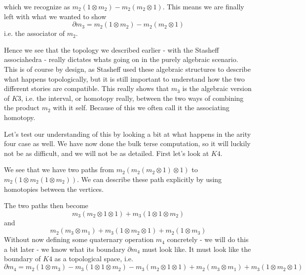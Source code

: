 which we recognize as $m_2(1\otimes m_2) - m_2(m_2\otimes 1)$. This means we are finally left with what we wanted to show 
\begin{equation*}
    \partial m_3 = m_2(1\otimes m_2)-m_2(m_2\otimes 1)
\end{equation*}
i.e. the associator of $m_2$. 

Hence we see that the topology we described earlier - with the Stasheff associahedra - really dictates whats going on in the purely algebraic scenario. This is of course by design, as Stasheff used these algebraic structures to describe what happens topologically, but it is still important to understand how the two different stories are compatible. This really shows that $m_3$ is the algebraic version of $K3$, i.e. the interval, or homotopy really, between the two ways of combining the product $m_2$ with it self. Because of this we often call it the associating homotopy. 

Let's test our understanding of this by looking a bit at what happens in the arity four case as well. We have now done the bulk terse computation, so it will luckily not be as difficult, and we will not be as detailed. First let's look at $K4$. 

\hspace{2mm}

\begin{center}
\def\svgwidth{0.7\textwidth}

\end{center}

\hspace{1mm}

We see that we have two paths from $m_2(m_2(m_2\otimes 1)\otimes 1)$ to $m_2(1\otimes m_2(1\otimes m_2))$. We can describe these path explicitly by using homotopies between the vertices. 

\hspace{1mm}

\begin{center}
\def\svgwidth{0.7\textwidth}

\end{center}

\hspace{1mm}

The two paths then become
\begin{equation*}
    m_3(m_2\otimes 1\otimes 1) + m_3(1\otimes 1\otimes m_2)
\end{equation*}
and 
\begin{equation*}
    m_2(m_3\otimes m_1)+m_3(1\otimes m_2\otimes 1)+m_2(1\otimes m_3)
\end{equation*}
Without now defining some quaternary operation $m_4$ concretely - we will do this a bit later - we know what its boundary $\partial m_4$ must look like. It must look like the boundary of $K4$ as a topological space, i.e. 
\begin{equation*}
    \partial m_4 = m_2(1\otimes m_3) - m_3(1\otimes 1\otimes m_2) - m_3(m_2\otimes 1\otimes 1) + m_2(m_3\otimes m_1)+m_3(1\otimes m_2\otimes 1)
\end{equation*}

